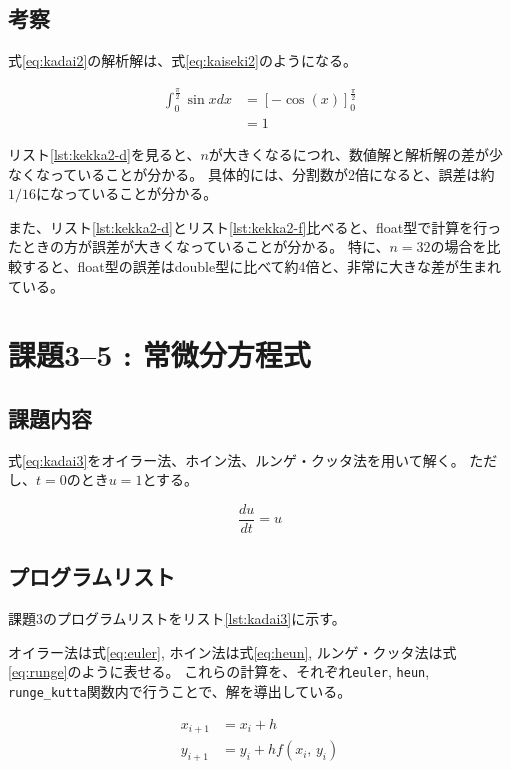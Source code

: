 \documentclass[a4j,titlepage]{jsarticle}
\begin{document}
\subsection{考察}
式\ref{eq:kadai2}の解析解は、式\ref{eq:kaiseki2}のようになる。

\begin{align}
  \int_0^\frac{\pi}{2} \sin x dx &= \left[ -\cos(x) \right]_0^\frac{\pi}{2} \nonumber \\
  &= 1
  \label{eq:kaiseki2}
\end{align}

リスト\ref{lst:kekka2-d}を見ると、$n$が大きくなるにつれ、数値解と解析解の差が少なくなっていることが分かる。
具体的には、分割数が2倍になると、誤差は約$1/16$になっていることが分かる。

また、リスト\ref{lst:kekka2-d}とリスト\ref{lst:kekka2-f}比べると、float型で計算を行ったときの方が誤差が大きくなっていることが分かる。
特に、$n=32$の場合を比較すると、float型の誤差はdouble型に比べて約4倍と、非常に大きな差が生まれている。


\section{課題3--5 : 常微分方程式}
\subsection{課題内容}
式\ref{eq:kadai3}をオイラー法、ホイン法、ルンゲ・クッタ法を用いて解く。
ただし、$t = 0$のとき$u = 1$とする。

\begin{equation}
  \frac{du}{dt} = u
  \label{eq:kadai3}
\end{equation}


\subsection{プログラムリスト}
課題3のプログラムリストをリスト\ref{lst:kadai3}に示す。

オイラー法は式\ref{eq:euler}, ホイン法は式\ref{eq:heun}, ルンゲ・クッタ法は式\ref{eq:runge}のように表せる。
これらの計算を、それぞれ\texttt{euler}, \texttt{heun}, \texttt{runge\_kutta}関数内で行うことで、解を導出している。

\begin{equation}
  \begin{aligned}
    x_{i+1} &= x_i + h \\
    y_{i+1} &= y_i + h f(x_i, \, y_i)
  \end{aligned}
  \label{eq:euler}
\end{equation}
\end{document}
